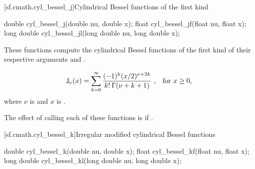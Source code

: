 [sf.cmath.cyl_bessel_j]{Cylindrical Bessel functions of the first kind}%
%
%
%
%
%
\begin{itemdecl}
double       cyl_bessel_j(double nu, double x);
float        cyl_bessel_jf(float nu, float x);
long double  cyl_bessel_jl(long double nu, long double x);
\end{itemdecl}

\begin{itemdescr}

\pnum\effects
These functions compute
the cylindrical Bessel functions of the first kind
of their respective arguments
 and .

\pnum\returns
\[ \mathsf{J}_\nu(x) =
   \sum_{k=0}^\infty \frac{(-1)^k (x/2)^{\nu+2k}}{k! \: \Gamma(\nu+k+1)}
   \text{ ,\quad for $x \ge 0$,} \]
where
$\nu$ is  and
$x$ is .

\pnum\remarks
The effect of calling each of these functions
is 
if .
\end{itemdescr}

[sf.cmath.cyl_bessel_k]{Irregular modified cylindrical Bessel functions}%
%
%
%
%
%
\begin{itemdecl}
double       cyl_bessel_k(double nu, double x);
float        cyl_bessel_kf(float nu, float x);
long double  cyl_bessel_kl(long double nu, long double x);
\end{itemdecl}

